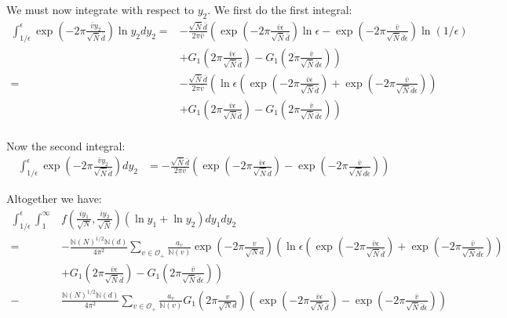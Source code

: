 \documentclass{article}
\theoremstyle{plain}
\begin{document}
We must now integrate with respect to $y_2$. We first do the first integral:
\begin{align*}
\int_{1/\epsilon}^{\epsilon} \exp \left( -2\pi \frac{\bar{v} y_2}{\sqrt{\bar{N}}\bar{d}}\right) \ln y_2 dy_2
 = & -\frac{\sqrt{\bar{N}}\bar{d}}{2 \pi\bar{v}} \left( \exp \left( -2\pi \frac{\bar{v} \epsilon}{\sqrt{\bar{N}}\bar{d}}\right) \ln \epsilon -  \exp \left( -2\pi \frac{\bar{v} }{\sqrt{\bar{N}}\bar{d}\epsilon}\right) \ln(1/\epsilon) \right. \\
 & + \left. G_1\left(2\pi \frac{\bar{v} \epsilon}{\sqrt{\bar{N}}\bar{d}}\right)-G_1\left( 2\pi \frac{\bar{v} }{\sqrt{\bar{N}}\bar{d}\epsilon}\right) \right)\\
= & -\frac{\sqrt{\bar{N}}\bar{d}}{2 \pi\bar{v}} \left( \ln \epsilon \left( \exp \left( -2\pi \frac{\bar{v} \epsilon}{\sqrt{\bar{N}}\bar{d}}\right) +  \exp \left( -2\pi \frac{\bar{v} }{\sqrt{\bar{N}}\bar{d}\epsilon}\right) \right) \right. \\
 & + \left. G_1\left(2\pi \frac{\bar{v} \epsilon}{\sqrt{\bar{N}}\bar{d}}\right)-G_1\left( 2\pi \frac{\bar{v} }{\sqrt{\bar{N}}\bar{d}\epsilon}\right) \right)\\
\end{align*}

Now the second integral:
\begin{align*}
\int_{1/ \epsilon}^{\epsilon} \exp \left( -2\pi \frac{\bar{v} y_2}{\sqrt{\bar{N}}\bar{d}}\right) dy_2 
& =  - \frac{\sqrt{\bar{N}}\bar{d}}{2 \pi \bar{v}} \left( \exp \left( -2\pi \frac{\bar{v} \epsilon}{\sqrt{\bar{N}}\bar{d}}\right) -  \exp \left( -2\pi \frac{\bar{v} }{\sqrt{\bar{N}}\bar{d}\epsilon}\right)\right)
\end{align*}

Altogether we have:
\begin{align*}
\int_{1/\epsilon}^{\epsilon} \int_{1}^{\infty} & f\left(\frac{iy_1}{\sqrt{N}},\frac{iy_2}{\sqrt{\bar{N}}}\right) (\ln y_1+\ln y_2)dy_1 dy_2 \\
= &- \frac{\mathbb{N}(N)^{1/2}\mathbb{N}(d)}{4 \pi^2 }\sum_{v \in \mathcal{O}_+}  \frac{a_v}{\mathbb{N}(v)}  \exp\left( -2\pi \frac{v}{\sqrt{N} d}\right) \left( \ln \epsilon \left( \exp \left( -2\pi \frac{\bar{v} \epsilon}{\sqrt{\bar{N}}\bar{d}}\right) +  \exp \left( -2\pi \frac{\bar{v} }{\sqrt{\bar{N}}\bar{d}\epsilon}\right) \right) \right. \\
& + \left. G_1\left(2\pi \frac{\bar{v} \epsilon}{\sqrt{\bar{N}}\bar{d}}\right)-G_1\left( 2\pi \frac{\bar{v} }{\sqrt{\bar{N}}\bar{d}\epsilon}\right) \right) \\
- & \frac{\mathbb{N}(N)^{1/2}\mathbb{N}(d)}{4 \pi^2 } \sum_{v \in \mathcal{O}_+} \frac{a_v}{\mathbb{N}(v)}  G_1\left( 2\pi \frac{v}{\sqrt{N} d}\right) \left( \exp \left( -2\pi \frac{\bar{v} \epsilon}{\sqrt{\bar{N}}\bar{d}}\right) -  \exp \left( -2\pi \frac{\bar{v} }{\sqrt{\bar{N}}\bar{d}\epsilon}\right)\right)
\end{align*}
\end{document}

